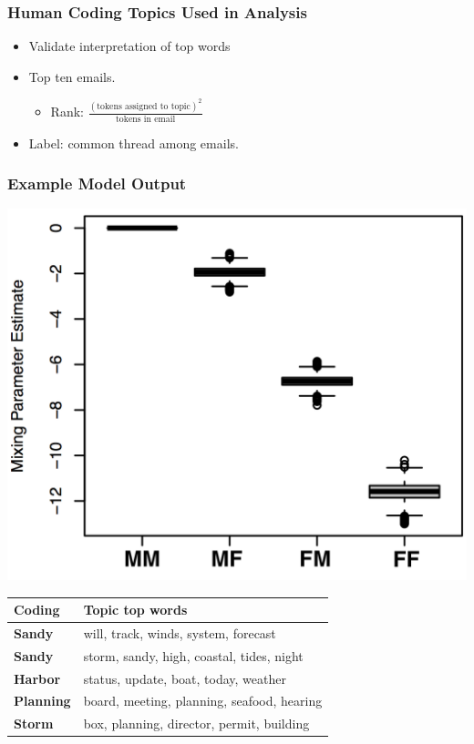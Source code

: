 \documentclass[xcolor={table}]{beamer}
\newcommand{\male}[1]{\colorbox{male}{#1}}
\begin{document}
\begin{frame}\frametitle{Human Coding Topics Used in Analysis}
	\LARGE
	\begin{itemize}
		\item Validate interpretation of top words
		\vspace*{.4in}
		\item Top ten emails.
		\vspace*{.2in}
		\begin{itemize}
			\LARGE
			\item Rank: $\frac{(\text{tokens assigned to topic})^2}{\text{tokens in email}}$
		\end{itemize}
		\vspace*{.2in}
		\item Label: common thread among emails.
	\end{itemize}
\end{frame}

\begin{frame}\frametitle{Example Model Output}
	
	\centering
	\includegraphics[width = .56\textwidth]{./images/Dare_3_MP.png}\\
	\begin{tabular}{l l}
	\toprule
	Coding & Topic top words\\
	\midrule
	\male{\textbf{Sandy}} & will, track, winds, system, forecast\\ 
	\male{\textbf{Sandy}} & storm, sandy, high, coastal, tides, night\\ 
	\male{\textbf{Harbor}} & status, update, boat, today, weather\\ 
	\male{\textbf{Planning}} & board, meeting, planning, seafood, hearing\\ 
	\male{\textbf{Storm}} & box, planning, director,  permit, building \\ 
	\bottomrule

	\end{tabular}
	
\end{frame}
\end{document}
